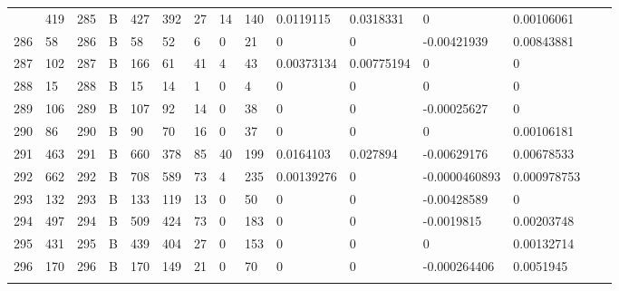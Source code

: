\begin{longtable}{lllllllllllllll}
\begin{comment}
	285 & 419               & 285 & B   & 427               & 392               & 27                & 14   & 140        & 0.0119115      & 0.0318331      & 0             & 0.00106061   \\
	286 & 58                & 286 & B   & 58                & 52                & 6                 & 0    & 21         & 0              & 0              & -0.00421939   & 0.00843881   \\
	287 & 102               & 287 & B   & 166               & 61                & 41                & 4    & 43         & 0.00373134     & 0.00775194     & 0             & 0            \\
	288 & 15                & 288 & B   & 15                & 14                & 1                 & 0    & 4          & 0              & 0              & 0             & 0            \\
	289 & 106               & 289 & B   & 107               & 92                & 14                & 0    & 38         & 0              & 0              & -0.00025627   & 0            \\
	290 & 86                & 290 & B   & 90                & 70                & 16                & 0    & 37         & 0              & 0              & 0             & 0.00106181   \\
	291 & 463               & 291 & B   & 660               & 378               & 85                & 40   & 199        & 0.0164103      & 0.027894       & -0.00629176   & 0.00678533   \\
	292 & 662               & 292 & B   & 708               & 589               & 73                & 4    & 235        & 0.00139276     & 0              & -0.0000460893 & 0.000978753  \\
	293 & 132               & 293 & B   & 133               & 119               & 13                & 0    & 50         & 0              & 0              & -0.00428589   & 0            \\
	294 & 497               & 294 & B   & 509               & 424               & 73                & 0    & 183        & 0              & 0              & -0.0019815    & 0.00203748   \\
	295 & 431               & 295 & B   & 439               & 404               & 27                & 0    & 153        & 0              & 0              & 0             & 0.00132714   \\
	296 & 170               & 296 & B   & 170               & 149               & 21                & 0    & 70         & 0              & 0              & -0.000264406  & 0.0051945    \\

\end{comment}
\end{longtable}
